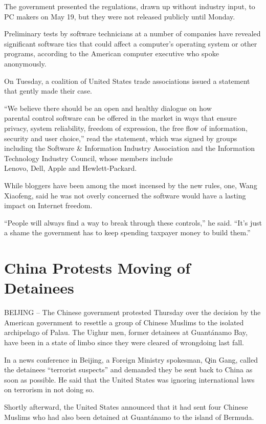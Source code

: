 ﻿\documentclass[12pt,a4paper,onecolumn]{article}
\begin{document}
The government presented the regulations, drawn up without industry input, to PC makers on May 19,
but they were not released publicly until Monday.

Preliminary tests by software technicians at a number of companies have revealed significant
software tics that could affect a computer's operating system or other programs, according to the
American computer executive who spoke anonymously.

On Tuesday, a coalition of United States trade associations issued a statement that gently made
their case.

``We believe there should be an open and healthy dialogue on how \\parental control software can be
offered in the market in ways that ensure privacy, system reliability, freedom of expression, the
free flow of information, security and user choice,'' read the statement, which was signed by groups
including the Software \& Information Industry Association and the Information Technology Industry
Council, whose members include \\Lenovo, Dell, Apple and Hewlett-Packard.

While bloggers have been among the most incensed by the new rules, one, Wang Xiaofeng, said he was
not overly concerned the software would have a lasting impact on Internet freedom.

``People will always find a way to break through these controls,'' he said. ``It's just a shame the
government has to keep spending taxpayer money to build them.''

\section{China Protests Moving of Detainees}

BEIJING -- The Chinese government protested Thursday over the decision by the American government to
resettle a group of Chinese Muslims to the isolated archipelago of Palau. The Uighur men, former
detainees at Guant\'anamo Bay, have been in a state of limbo since they were cleared of wrongdoing
last fall.

In a news conference in Beijing, a Foreign Ministry spokesman, Qin Gang, called the detainees
``terrorist suspects'' and demanded they be sent back to China as soon as possible. He said that the
United States was ignoring international laws on terrorism in not doing so.

Shortly afterward, the United States announced that it had sent four Chinese Muslims who had also
been detained at Guant\'anamo to the island of Bermuda.
\end{document}
